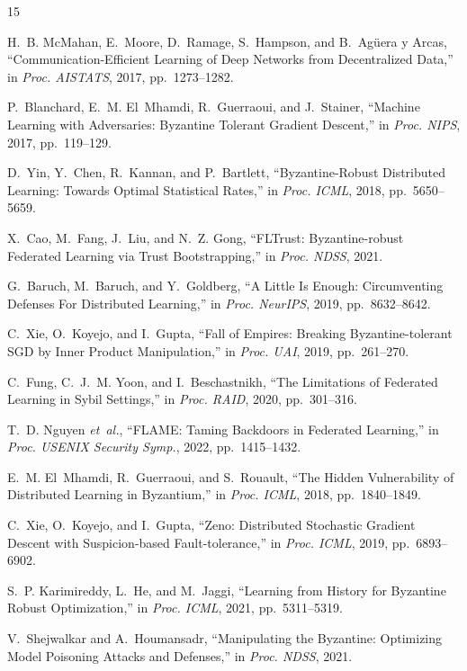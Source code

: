\documentclass[10pt, conference]{IEEEtran}
\begin{document}
\begin{thebibliography}{15} 

H.~B. McMahan, E.~Moore, D.~Ramage, S.~Hampson, and B.~{Ag\"{u}era y Arcas},
``Communication-Efficient Learning of Deep Networks from Decentralized Data,''
in \textit{Proc. AISTATS}, 2017, pp.~1273--1282.

P.~Blanchard, E.~M. El~Mhamdi, R.~Guerraoui, and J.~Stainer,
``Machine Learning with Adversaries: Byzantine Tolerant Gradient Descent,''
in \textit{Proc. NIPS}, 2017, pp.~119--129.

D.~Yin, Y.~Chen, R.~Kannan, and P.~Bartlett,
``Byzantine-Robust Distributed Learning: Towards Optimal Statistical Rates,''
in \textit{Proc. ICML}, 2018, pp.~5650--5659.

X.~Cao, M.~Fang, J.~Liu, and N.~Z. Gong,
``FLTrust: Byzantine-robust Federated Learning via Trust Bootstrapping,''
in \textit{Proc. NDSS}, 2021.

G.~Baruch, M.~Baruch, and Y.~Goldberg,
``A Little Is Enough: Circumventing Defenses For Distributed Learning,''
in \textit{Proc. NeurIPS}, 2019, pp.~8632--8642.

C.~Xie, O.~Koyejo, and I.~Gupta,
``Fall of Empires: Breaking Byzantine-tolerant SGD by Inner Product Manipulation,''
in \textit{Proc. UAI}, 2019, pp.~261--270.

C.~Fung, C.~J.~M. Yoon, and I.~Beschastnikh,
``The Limitations of Federated Learning in Sybil Settings,''
in \textit{Proc. RAID}, 2020, pp.~301--316.

T.~D. Nguyen \textit{et~al.},
``FLAME: Taming Backdoors in Federated Learning,''
in \textit{Proc. USENIX Security Symp.}, 2022, pp.~1415--1432.

E.~M. El~Mhamdi, R.~Guerraoui, and S.~Rouault,
``The Hidden Vulnerability of Distributed Learning in Byzantium,''
in \textit{Proc. ICML}, 2018, pp.~1840--1849.

C.~Xie, O.~Koyejo, and I.~Gupta,
``Zeno: Distributed Stochastic Gradient Descent with Suspicion-based Fault-tolerance,''
in \textit{Proc. ICML}, 2019, pp.~6893--6902.

S.~P. Karimireddy, L.~He, and M.~Jaggi,
``Learning from History for Byzantine Robust Optimization,''
in \textit{Proc. ICML}, 2021, pp.~5311--5319.

V.~Shejwalkar and A.~Houmansadr,
``Manipulating the Byzantine: Optimizing Model Poisoning Attacks and Defenses,''
in \textit{Proc. NDSS}, 2021.


\end{thebibliography}
\end{document}
